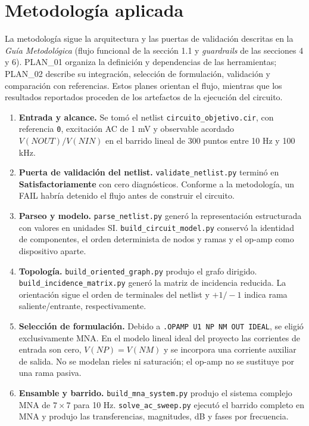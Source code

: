 \section{Metodología aplicada}
La metodología sigue la arquitectura y las puertas de validación descritas en la \textit{Guía Metodológica} (flujo funcional de la sección 1.1 y \textit{guardrails} de las secciones 4 y 6). PLAN\_01 organiza la definición y dependencias de las herramientas; PLAN\_02 describe su integración, selección de formulación, validación y comparación con referencias. Estos planes orientan el flujo, mientras que los resultados reportados proceden de los artefactos de la ejecución del circuito.

\begin{enumerate}
  \item \textbf{Entrada y alcance.} Se tomó el netlist \texttt{circuito\_objetivo.cir}, con referencia \texttt{0}, excitación AC de 1 mV y observable acordado $V(N OUT)/V(N IN)$ en el barrido lineal de 300 puntos entre 10 Hz y 100 kHz.
  \item \textbf{Puerta de validación del netlist.} \texttt{validate\_netlist.py} terminó en \textbf{Satisfactoriamente} con cero diagnósticos. Conforme a la metodología, un FAIL habría detenido el flujo antes de construir el circuito.
  \item \textbf{Parseo y modelo.} \texttt{parse\_netlist.py} generó la representación estructurada con valores en unidades SI. \texttt{build\_circuit\_model.py} conservó la identidad de componentes, el orden determinista de nodos y ramas y el op-amp como dispositivo aparte.
  \item \textbf{Topología.} \texttt{build\_oriented\_graph.py} produjo el grafo dirigido. \texttt{build\_incidence\_matrix.py} generó la matriz de incidencia reducida. La orientación sigue el orden de terminales del netlist y $+1/-1$ indica rama saliente/entrante, respectivamente.
  \item \textbf{Selección de formulación.} Debido a \texttt{.OPAMP U1 NP NM OUT IDEAL}, se eligió exclusivamente MNA. En el modelo lineal ideal del proyecto las corrientes de entrada son cero, $V(NP)=V(NM)$ y se incorpora una corriente auxiliar de salida. No se modelan rieles ni saturación; el op-amp no se sustituye por una rama pasiva.
  \item \textbf{Ensamble y barrido.} \texttt{build\_mna\_system.py} produjo el sistema complejo MNA de $7\times7$ para 10 Hz. \texttt{solve\_ac\_sweep.py} ejecutó el barrido completo en MNA y produjo las transferencias, magnitudes, dB y fases por frecuencia.

\end{enumerate}
